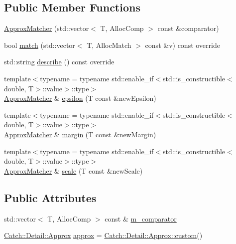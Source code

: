 \subsection*{Public Member Functions}
\begin{DoxyCompactItemize}
\item 
\mbox{\hyperlink{struct_catch_1_1_matchers_1_1_vector_1_1_approx_matcher_a23147d891d3d9b6bb0af599ee87bbcc2}{Approx\+Matcher}} (std\+::vector$<$ T, Alloc\+Comp $>$ const \&comparator)
\item 
bool \mbox{\hyperlink{struct_catch_1_1_matchers_1_1_vector_1_1_approx_matcher_af200c5c98e8e2a6f24617ef4a0a6830a}{match}} (std\+::vector$<$ T, Alloc\+Match $>$ const \&v) const override
\item 
std\+::string \mbox{\hyperlink{struct_catch_1_1_matchers_1_1_vector_1_1_approx_matcher_a760b0d1922d53b7ec327ac7418681c3f}{describe}} () const override
\item 
{\footnotesize template$<$typename  = typename std\+::enable\+\_\+if$<$std\+::is\+\_\+constructible$<$double, T$>$\+::value$>$\+::type$>$ }\\\mbox{\hyperlink{struct_catch_1_1_matchers_1_1_vector_1_1_approx_matcher}{Approx\+Matcher}} \& \mbox{\hyperlink{struct_catch_1_1_matchers_1_1_vector_1_1_approx_matcher_a31c47dac5f7346b526a145da343f9e3e}{epsilon}} (T const \&new\+Epsilon)
\item 
{\footnotesize template$<$typename  = typename std\+::enable\+\_\+if$<$std\+::is\+\_\+constructible$<$double, T$>$\+::value$>$\+::type$>$ }\\\mbox{\hyperlink{struct_catch_1_1_matchers_1_1_vector_1_1_approx_matcher}{Approx\+Matcher}} \& \mbox{\hyperlink{struct_catch_1_1_matchers_1_1_vector_1_1_approx_matcher_a619714cd68a4791584e040902bff583c}{margin}} (T const \&new\+Margin)
\item 
{\footnotesize template$<$typename  = typename std\+::enable\+\_\+if$<$std\+::is\+\_\+constructible$<$double, T$>$\+::value$>$\+::type$>$ }\\\mbox{\hyperlink{struct_catch_1_1_matchers_1_1_vector_1_1_approx_matcher}{Approx\+Matcher}} \& \mbox{\hyperlink{struct_catch_1_1_matchers_1_1_vector_1_1_approx_matcher_a6856447aebfb7c4fe6b792900fb68f45}{scale}} (T const \&new\+Scale)
\end{DoxyCompactItemize}
\subsection*{Public Attributes}
\begin{DoxyCompactItemize}
\item 
std\+::vector$<$ T, Alloc\+Comp $>$ const  \& \mbox{\hyperlink{struct_catch_1_1_matchers_1_1_vector_1_1_approx_matcher_a482a43ccf47697830d23bf0beaf06b9b}{m\+\_\+comparator}}
\item 
\mbox{\hyperlink{class_catch_1_1_detail_1_1_approx}{Catch\+::\+Detail\+::\+Approx}} \mbox{\hyperlink{struct_catch_1_1_matchers_1_1_vector_1_1_approx_matcher_a0da9e77e66822ed7fd0164fc42420fa5}{approx}} = \mbox{\hyperlink{class_catch_1_1_detail_1_1_approx_aaf86dc0ee92272ac2d9839197a07951d}{Catch\+::\+Detail\+::\+Approx\+::custom}}()
\end{DoxyCompactItemize}
